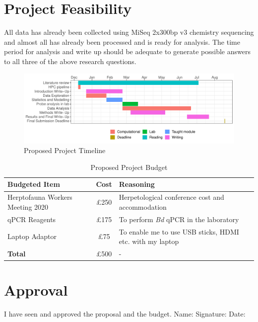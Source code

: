 \documentclass[11pt, a4paper, titlepage]{article}
\begin{document}
\section{Project Feasibility}

All data has already been collected using MiSeq 2x300bp v3 chemistry sequencing and almost all has already been processed and is ready for analysis. The time period for analysis and write up should be adequate to generate possible answers to all three of the above research questions. 

\begin{figure}[h!]
	\centering\includegraphics[width=1\textwidth]{GanttChart.pdf}
	\caption{Proposed Project Timeline}
\end{figure}

\begin{table}[h!]
	\small
	\begin{tabular} {| l | c | l |}  \hline
		\textbf{Budgeted Item} & \textbf{Cost} & \textbf{Reasoning} \\ \hline
		Herptofauna Workers Meeting 2020 & £250 & Herpetological conference cost and accommodation \\ \hline
		qPCR Reagents & £175 & To perform \textit{Bd} qPCR in the laboratory \\ \hline
		Laptop Adaptor & £75 & To enable me to use USB sticks, HDMI etc. with my laptop \\ \hline
		\textbf{Total} & £500  & - \\ \hline
	\end{tabular}
	\caption{Proposed Project Budget}
\end{table}

\newpage

\printbibliography

\newpage

\section{Approval}

I have seen and approved the proposal and the budget. 
\newline
\newline
\newline
\noindent Name:
\newline
\newline
\newline
\newline
Signature:
\newline
\newline
\newline
\newline
Date:
\end{document}
